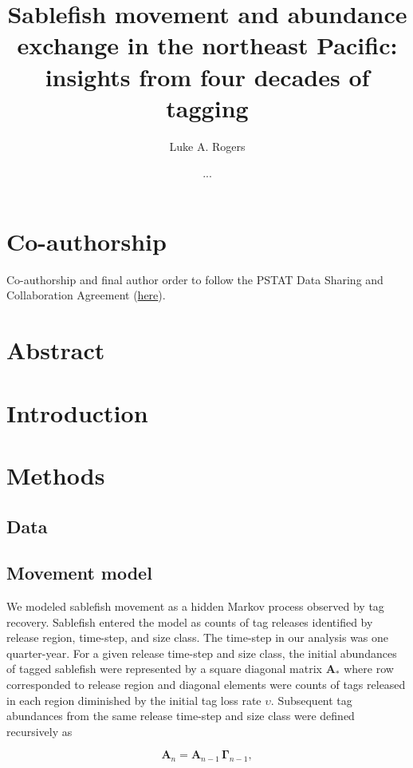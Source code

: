 \documentclass{article}
\title{Sablefish movement and abundance exchange in the northeast Pacific: insights from four decades of tagging}
\author[1]{Luke A. Rogers}
\author[]{...}
\affil[1]{Pacific Biological Station, Fisheries and Oceans Canada, Nanaimo, BC, V9T 6N7, Canada}
\begin{document}
\maketitle
\linenumbers
\setcounter{secnumdepth}{0}

\section{Co-authorship}
Co-authorship and final author order to follow the PSTAT Data Sharing and Collaboration Agreement (\href{https://docs.google.com/document/d/1AXIhq6lO_qOPf7q67s_SiDOD6qEfih0COtxQZo7v-Hc/edit?usp=sharing}{here}).

\section{Abstract}

\section{Introduction}

\section{Methods}

\subsection{Data}

\subsection{Movement model}

We modeled sablefish movement as a hidden Markov process \cite[][]{langrock-2012-flexible-practical} observed by tag recovery. Sablefish entered the model as counts of tag releases identified by release region, time-step, and size class. The time-step in our analysis was one quarter-year. For a given release time-step and size class, the initial abundances of tagged sablefish were represented by a square diagonal matrix $\boldsymbol{A}_*$ where row corresponded to release region and diagonal elements were counts of tags released in each region diminished by the initial tag loss rate $\upsilon$. Subsequent tag abundances from the same release time-step and size class were defined recursively as 

\begin{equation}
    \label{eq:abundance}
    \boldsymbol{A}_{n} = \boldsymbol{A}_{n-1} \, \boldsymbol{\Gamma}_{n-1},
\end{equation}
\end{document}
